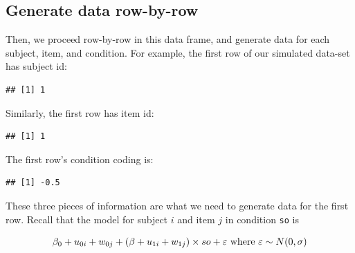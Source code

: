 \documentclass[
  12pt,
]{krantz}
\newenvironment{Shaded}{\begin{snugshade}}{\end{snugshade}}
\newcommand{\DecValTok}[1]{\textcolor[rgb]{0.00,0.00,0.81}{#1}}
\newcommand{\NormalTok}[1]{#1}
\newcommand{\SpecialCharTok}[1]{\textcolor[rgb]{0.00,0.00,0.00}{#1}}
\theoremstyle{definition}
\theoremstyle{definition}
\theoremstyle{definition}
\theoremstyle{definition}
\theoremstyle{remark}
\begin{document}
\hypertarget{generate-data-row-by-row}{%
\subsection{Generate data row-by-row}\label{generate-data-row-by-row}}

Then, we proceed row-by-row in this data frame, and generate data for each subject, item, and condition. For example, the first row of our simulated data-set has subject id:

\begin{Shaded}
\end{Shaded}

\begin{verbatim}
## [1] 1
\end{verbatim}

Similarly, the first row has item id:

\begin{Shaded}
\end{Shaded}

\begin{verbatim}
## [1] 1
\end{verbatim}

The first row's condition coding is:

\begin{Shaded}
\end{Shaded}

\begin{verbatim}
## [1] -0.5
\end{verbatim}

These three pieces of information are what we need to generate data for the first row. Recall that the model for subject \(i\) and item \(j\) in condition \texttt{so} is

\begin{equation}
\beta_0 + u_{0i} + w_{0j} + (\beta + u_{1i} + w_{1j})\times so + \varepsilon \hbox{ where } \varepsilon \sim N(0,\sigma)
\end{equation}
\end{document}
